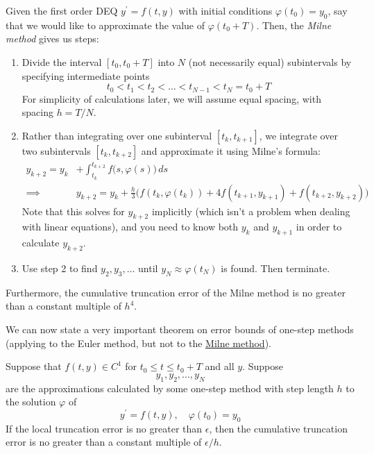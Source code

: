 \documentclass{article}
\newcounter{theorem}[section]
\begin{document}
    \begin{theorem}
      \label{thm:milne-method}
    Given the first order DEQ $y^\prime = f(t, y)$ with initial conditions $\varphi(t_0) = y_0$, say that we would like to approximate the value of $\varphi(t_0 + T)$. Then, the \textit{Milne method} gives us steps: 
    \begin{enumerate}
        \item Divide the interval $[t_0, t_0 + T]$ into $N$ (not necessarily equal) subintervals by specifying intermediate points 
        \begin{equation}
          t_0 < t_1 < t_2 < \ldots < t_{N-1} < t_N = t_0 + T
        \end{equation}
        For simplicity of calculations later, we will assume equal spacing, with spacing $h = T/N$. 
        \item Rather than integrating over one subinterval $[t_k, t_{k+1}]$, we integrate over two subintervals $[t_k, t_{k+2}]$ and approximate it using Milne's formula:
        \begin{align*}
            y_{k+2} = y_k & + \int_{t_k}^{t_{k+2}} f\big(s, \varphi(s)\big)\,ds \\
            \implies & y_{k+2} = y_k + \frac{h}{3} \big( f(t_k, \varphi(t_k)) + 4 f (t_{k+1}, y_{k+1}) + f(t_{k+2}, y_{k+2})\big)
        \end{align*}
        Note that this solves for $y_{k+2}$ implicitly (which isn't a problem when dealing with linear equations), and you need to know both $y_k$ and $y_{k+1}$ in order to calculate $y_{k+2}$. 
        \item Use step 2 to find $y_2, y_3, \ldots$ until $y_N \approx \varphi(t_N)$ is found. Then terminate. 
    \end{enumerate}
    Furthermore, the cumulative truncation error of the Milne method is no greater than a constant multiple of $h^4$. 
    \end{theorem}

    We can now state a very important theorem on error bounds of one-step methods (applying to the Euler method, but not to the \hyperref[thm:milne-method]{Milne method}). 

    \begin{theorem}
      \label{thm:truncation-error-bounds-on-one-step-methods}
    Suppose that $f(t, y) \in C^1$ for $t_0 \leq t \leq t_0 + T$ and all $y$. Suppose 
    \begin{equation}
      y_1, y_2, \ldots, y_N
    \end{equation}
    are the approximations calculated by some one-step method with step length $h$ to the solution $\varphi$ of 
    \begin{equation}
      y^\prime = f(t, y), \quad \varphi(t_0) = y_0
    \end{equation}
    If the local truncation error is no greater than $\epsilon$, then the cumulative truncation error is no greater than a constant multiple of $\epsilon/h$. 
    \end{theorem}
\end{document}
